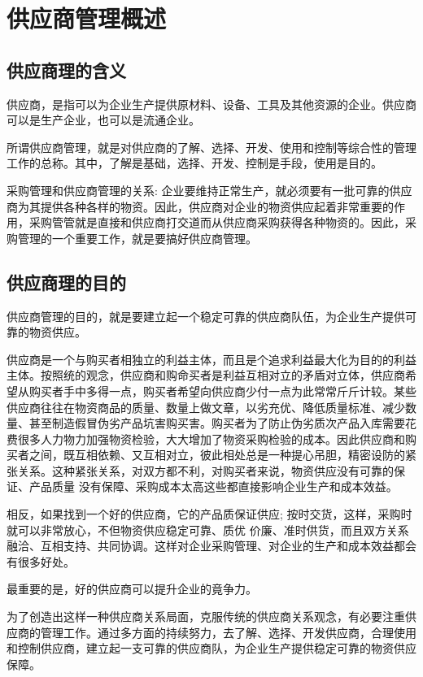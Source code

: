 \section {供应商管理概述}

\subsection {供应商理的含义}

    供应商，是指可以为企业生产提供原材料、设备、工具及其他资源的企业。供应商可以是生产企业，也可以是流通企业。

    所谓供应商管理，就是对供应商的了解、选择、开发、使用和控制等综合性的管理工作的总称。其中，了解是基础，选择、开发、控制是手段，使用是目的。

    采购管理和供应商管理的关系: 企业要维持正常生产，就必须要有一批可靠的供应商为其提供各种各样的物资。因此，供应商对企业的物资供应起着非常重要的作用，采购管管就是直接和供应商打交道而从供应商采购获得各种物资的。因此，采购管理的一个重要工作，就是要搞好供应商管理。

\subsection {供应商理的目的}

    供应商管理的目的，就是要建立起一个稳定可靠的供应商队伍，为企业生产提供可靠的物资供应。

    供应商是一个与购买者相独立的利益主体，而且是个追求利益最大化为目的的利益主体。按照统的观念，供应商和购命买者是利益互相对立的矛盾对立体，供应商希望从购买者手中多得一点，购买者希望向供应商少付一点为此常常斤斤计较。某些供应商往往在物资商品的质量、数量上做文章，以劣充优、降低质量标准、减少数量、甚至制造假冒伪劣产品坑害购买害。购买者为了防止伪劣质次产品入库需要花费很多人力物力加强物资检验，大大增加了物资采购检验的成本。因此供应商和购买者之间，既互相依赖、又互相对立，彼此相处总是一种提心吊胆，精密设防的紧张关系。这种紧张关系，对双方都不利，对购买者来说，物资供应没有可靠的保证、产品质量
没有保障、采购成本太高这些都直接影响企业生产和成本效益。

    相反，如果找到一个好的供应商，它的产品质保证供应; 按时交货，这样，采购时就可以非常放心，不但物资供应稳定可靠、质优
价廉、准时供货，而且双方关系融洽、互相支持、共同协调。这样对企业采购管理、对企业的生产和成本效益都会有很多好处。

    最重要的是，好的供应商可以提升企业的竟争力。

    为了创造出这样一种供应商关系局面，克服传统的供应商关系观念，有必要注重供应商的管理工作。通过多方面的持续努力，去了解、选择、开发供应商，合理使用和控制供应商，建立起一支可靠的供应商队，为企业生产提供稳定可靠的物资供应保障。

